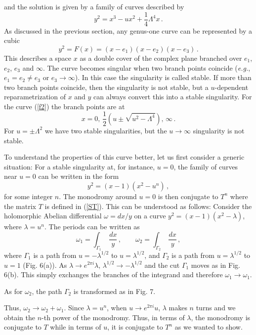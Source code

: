 and the solution is given by a family of curves described by  
\begin{equation}
y^2 = x^3 - ux^2 + \frac{1}{4} \Lambda^4 x \,.
\label{f2}
\end{equation}
As discussed in the previous section, any genus-one curve can be
represented by a cubic
$$
y^2 = F(x) = (x-e_1)(x-e_2) (x-e_3)\,.
$$
This describes a space $x$ as a double cover of the complex plane
branched over $e_1$, $e_2$, $e_3$ and $\infty$. The curve becomes
singular when two branch points coincide ({\it e.g.}, $e_1=e_2\not=
e_3$ or $e_3 \rightarrow \infty$). In this case the singularity is
called stable.  If more than two branch points coincide, then the
singularity is not stable, but a $u$-dependent reparametrization of
$x$ and $y$ can always convert this into a stable singularity. For the
curve (\ref{f2}) the branch points are at 
$$
x=0,\, \frac{1}{2} (u \pm \sqrt{u^2 - \Lambda^4}),\, \infty\,.
$$
For $u = \pm \Lambda^2$ we have two stable singularities, but the $u
\rightarrow \infty$ singularity is not stable.  

To understand the properties of this curve better, let us first
consider a generic situation: For a stable singularity at, for
instance, $u = 0$, the family of curves near $u=0$ can be written in
the form 
$$
y^2 = (x-1)(x^2 - u^n)\,, 
$$
for some integer $n$. The monodromy around $u=0$ is then conjugate to
$T^n$ where the matrix $T$ is defined in (\ref{ST}). This can be
understood as follows: Consider the holomorphic Abelian differential
$\omega = dx/y$ on a curve $y^2=(x-1)(x^2-\lambda)$, where $\lambda =
u^n$. The periods can be written as  
$$
\omega_1 = \int_{\Gamma_1}\;\frac{dx}{y}\,, \qquad
\omega_2 = \int_{\Gamma_2}\;\frac{dx}{y}\,,
$$
where $\Gamma_1$ is a path from $u=-\lambda^{1/2}$ to
$u=\lambda^{1/2}$, and $\Gamma_2$ is a path from $u=\lambda^{1/2}$ to  
$u=1$ (Fig. 6(a)). As $\lambda \rightarrow e^{2 \pi i} \lambda$,
$\lambda^{1/2} \rightarrow -\lambda^{1/2}$ and the cut $\Gamma_1$ 
moves as in Fig. 6(b). This simply exchanges the branches of the
integrand and therefore $\omega_1 \rightarrow \omega_1$.  


\noindent As for $\omega_2$, the path $\Gamma_2$ is transformed as in
Fig. 7.  

\noindent Thus, $\omega_2 \rightarrow \omega_2 + \omega_1$. Since
$\lambda = u^n$, when $u \rightarrow e^{2\pi i}u$, $\lambda$ makes $n$
turns and we obtain the $n$-th power of the monodromy. Thus, in terms
of $\lambda$, the monodromy is conjugate to $T$ while in terms of $u$,
it is conjugate to $T^n$ as we wanted to show. 


